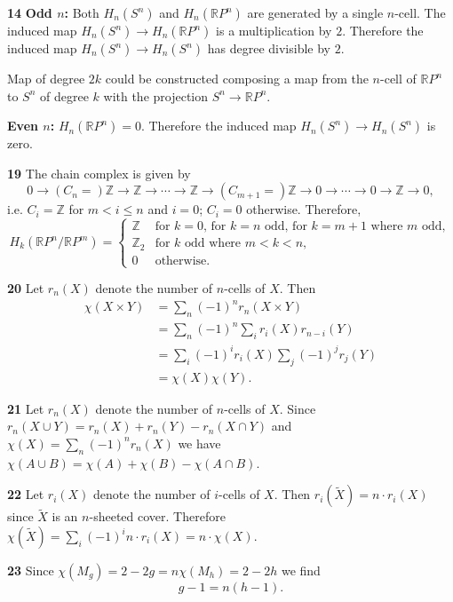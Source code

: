 \documentclass{article}
\makeatletter
\newcommand*{\shifttext}[1]{%
  \settowidth{\@tempdima}{#1}%
  \hspace{-\@tempdima}#1%
}
\newcommand{\plabel}[1]{%
\shifttext{\textbf{#1}\quad}%
}
\makeatother
\begin{document}
\plabel{14}%
\textbf{Odd $n$:}
Both $H_n(S^n)$ and $H_n(\mathbb{R}P^n)$ are generated by a single $n$-cell.
The induced map $H_n(S^n) \rightarrow H_n(\mathbb{R}P^n)$ is a multiplication by $2$.
Therefore the induced map $H_n(S^n) \rightarrow H_n(S^n)$ has degree divisible by $2$.
\par
Map of degree $2k$ could be constructed composing a map from the $n$-cell of $\mathbb{R}P^n$ to $S^n$ of degree $k$ with the projection $S^n \rightarrow \mathbb{R}P^n$.

\textbf{Even $n$:}
$H_n(\mathbb{R}P^n) = 0$.
Therefore the induced map $H_n(S^n) \rightarrow H_n(S^n)$ is zero.

\plabel{19}%
The chain complex is given by
\begin{equation*}
    0 \rightarrow (C_n=)\mathbb{Z} \xrightarrow{} \mathbb{Z} \xrightarrow{} \cdots \xrightarrow{} \mathbb{Z} \xrightarrow{} (C_{m+1}=)\mathbb{Z} \xrightarrow{} 0 \rightarrow \cdots \rightarrow 0 \rightarrow \mathbb{Z} \rightarrow 0,
\end{equation*}
i.e. $C_i = \mathbb{Z}$ for $m<i\le n$ and $i=0$; $C_i = 0$ otherwise.
Therefore,
\begin{equation*}
    H_k(\mathbb{R}P^n/\mathbb{R}P^m) = \begin{cases}
        \mathbb{Z} & \text{for $k=0$, for $k=n$ odd, for $k=m+1$ where $m$ odd}, \\
        \mathbb{Z}_2 & \text{for $k$ odd where $m<k<n$}, \\
        0 & \text{otherwise}.
    \end{cases}
\end{equation*}

\plabel{20}%
Let $r_n(X)$ denote the number of $n$-cells of $X$. Then
\begin{align*}
    \chi(X\times Y) &= \sum_n (-1)^n r_n(X\times Y) \\
    &= \sum_n (-1)^n \sum_{i} r_{i}(X) r_{n-i}(Y) \\
    &= \sum_i (-1)^i  r_{i}(X) \sum_j (-1)^j r_{j}(Y) \\
    &= \chi(X) \chi(Y).
\end{align*}

\plabel{21}%
Let $r_n(X)$ denote the number of $n$-cells of $X$.
Since $r_n(X\cup Y) = r_n(X) + r_n(Y) - r_n(X\cap Y)$ and $\chi(X) = \sum_n (-1)^n r_n(X)$ we have $\chi(A \cup B) = \chi(A) + \chi(B) - \chi(A\cap B)$.

\plabel{22}%
Let $r_i(X)$ denote the number of $i$-cells of $X$.
Then $r_i(\tilde{X}) = n\cdot r_i(X)$ since $\tilde{X}$ is an $n$-sheeted cover.
Therefore $\chi(\tilde{X}) = \sum_i (-1)^i n\cdot r_i(X) = n\cdot \chi(X)$.

\plabel{23}%
Since $\chi(M_g) = 2 - 2g = n\chi(M_h) = 2 - 2h$ we find
\[ g-1 = n(h-1). \]
\end{document}
